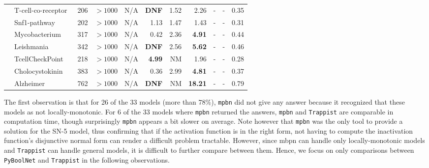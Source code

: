 \documentclass[preprint,12pt]{elsarticle}
\newcounter{rownumber}
\newcommand\rownb{\stepcounter{rownumber}\arabic{rownumber}}
\begin{document}
\begin{table}[!htb]
{\begin{tabular}{rlrrrrrrrrr}
    \midrule %
    \rownb & T-cell-co-receptor~\cite{DesignPrinciplesGeneNetworks} & 206 & $>1000$ & N/A & \textbf{DNF} & 1.52 & 2.26 & - & - & 0.35 \\
    \rownb & Snf1-pathway~\cite{Lubitz2015} & 202 & $>1000$ & N/A & 1.13 & 1.47 & 1.43 & - & - & 0.31 \\
    \rownb & Mycobacterium~\cite{DesignPrinciplesGeneNetworks} & 317 & $>1000$ & N/A & 0.42 & 2.36 & \textbf{4.91} & - & - & 0.44 \\
    \rownb & Leishmania~\cite{DesignPrinciplesGeneNetworks} & 342 & $>1000$ & N/A & \textbf{DNF} & 2.56 & \textbf{5.62} & - & - & 0.46 \\
    \rownb & TcellCheckPoint~\cite{hernandez2020computational} & 218 & $>1000$ & N/A & \textbf{4.99} & NM & 1.96 & - & - & 0.28 \\
    \rownb & Cholocystokinin~\cite{aghamiri2020automated} & 383 & $>1000$ & N/A & 0.36 & 2.99 & \textbf{4.81} & - & - & 0.37 \\
    \rownb & Alzheimer~\cite{aghamiri2020automated} & 762 & $>1000$ & N/A & \textbf{DNF} & NM & \textbf{18.21} & - & - & 0.79 \\
    
    \bottomrule
  \end{tabular}
  }
\end{table}

The first observation is that for 26 of the 33 models (more than 78\%), \texttt{mpbn} did not give any answer because it recognized that these models as not locally-monotonic.
For 6 of the 33 models where \texttt{mpbn} returned the answers, \texttt{mpbn} and \texttt{Trappist} are comparable in computation time, though surprisingly \texttt{mpbn} appears a bit slower on average.
Note however that \texttt{mpbn} was the only tool to provide a solution for the SN-5 model, thus confirming that if the activation function is in the right form, not having to compute the inactivation function's disjunctive normal form can render a difficult problem tractable.
However, since mbpn can handle only locally-monotonic models and \texttt{Trappist} can handle general models, it is difficult to further compare between them.
Hence, we focus on only comparisons between \texttt{PyBoolNet} and \texttt{Trappist} in the following observations.
\end{document}
